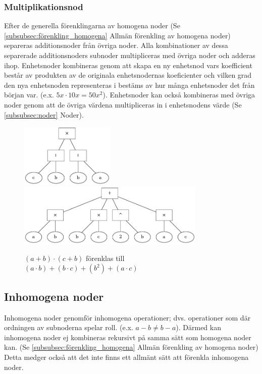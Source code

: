 \documentclass[12pt,a4paper]{article}
\begin{document}
\subsubsection{Multiplikationsnod}
Efter de generella förenklingarna av homogena noder (Se \ref{subsubsec:förenkling_homogena} Allmän förenkling av homogena noder) separeras additionsnoder från övriga noder. Alla kombinationer av dessa separerade additionsnoders subnoder multipliceras med övriga noder och adderas ihop. Enhetsnoder kombineras genom att skapa en ny enhetsnod vars koefficient består av produkten av de originala enhetsnodernas koeficienter och vilken grad den nya enhetsnoden representeras i bestäms av hur många enhetsnoder det från början var. (e.x. \(5x \cdot 10x = 50x^{2}\)). Enhetsnoder kan också kombineras med övriga noder genom att de övriga värdena multipliceras in i enhetsnodens värde (Se \ref{subsubsec:noder} Noder).
\begin{figure}[h!]
  \centering
  \includegraphics[width=0.4\textwidth]{image26}
  \includegraphics[width=0.8\textwidth]{image32}
  \caption{\((a + b) \cdot (c + b)\) förenklas till \((a \cdot b) + (b \cdot c) + (b ^ 2) + (a \cdot c)\)}
\end{figure}
\subsection{Inhomogena noder}
\label{subsec:inhomogena_noder}
Inhomogena noder genomför inhomogena operationer; dvs. operationer som där ordningen av subnoderna spelar roll. (e.x. \(a - b \neq b - a\)). Därmed kan inhomogena noder ej kombineras rekursivt på samma sätt som homogena noder kan. (Se \ref{subsubsec:förenkling_homogena} Allmän förenkling av homogena noder) Detta medger också att det inte finns ett allmänt sätt att förenkla inhomogena noder.
\end{document}

